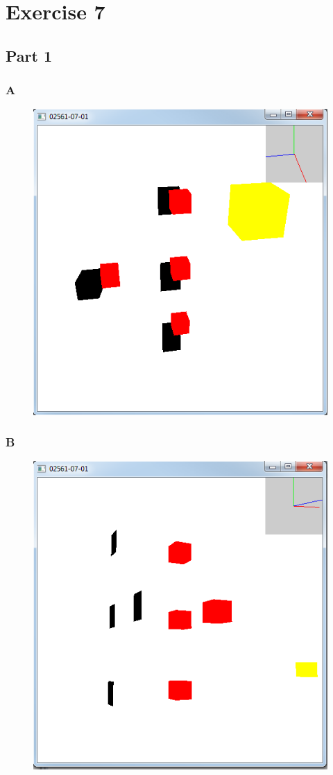 \documentclass[11pt]{article}
\begin{document}
\section{Exercise 7}
\subsection{Part 1}
\subsubsection{A}
\begin{figure}[H]
	\centering
	\includegraphics[width=0.5\linewidth]{images/e07p1point}
	\label{fig:e07p1point}
\end{figure}

\subsubsection{B}
\begin{figure}[H]
	\centering
	\includegraphics[width=0.5\linewidth]{images/e07p1directional}
	\label{fig:e07p1directional}
\end{figure}
\end{document}
